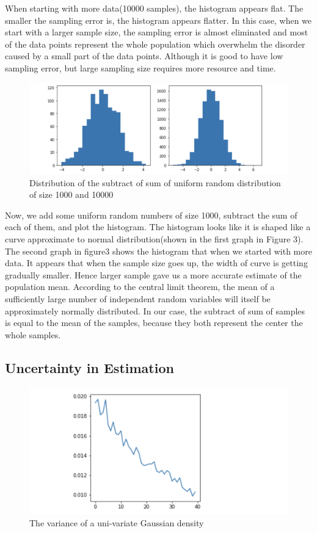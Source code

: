 \documentclass[10pt]{article}
\begin{document}
When starting with more data(10000 samples), the histogram appears flat. The smaller the sampling error is, the histogram appears flatter. In this case, when we start with a larger sample size, the sampling error is almost eliminated and most of the data points represent the whole population which overwhelm the disorder caused by a small part of the data points. Although it is good to have low sampling error, but large sampling size requires more resource and time.

\begin{figure}
\centering 
\vspace{-7mm}
\hspace{20mm}
\includegraphics[width=0.7\linewidth]{sumofuniform2.png} 
\caption{\footnotesize  Distribution of the subtract of sum of uniform random distribution of size 1000 and 10000}
\centering
\end{figure}

Now, we add some uniform random numbers of size 1000, subtract the sum of each of them, and plot the histogram. The histogram looks like it is shaped like a curve approximate to normal distribution(shown in the first graph in Figure 3). The second graph in figure3 shows the histogram that when we started with more data. It appears that when the sample size goes up, the width of curve is getting gradually smaller. Hence larger sample gave us a more accurate estimate of the population mean. According to the central limit theorem, the mean of a sufficiently large number of independent random variables will itself be approximately normally distributed. In our case, the subtract of sum of samples is equal to the mean of the samples, because they both represent the center the whole samples. 

\subsection{Uncertainty in Estimation}

\begin{figure}
\centering 
\vspace{-5mm}
\hspace{20mm}
\includegraphics[width=0.5\linewidth]{UncertaintyInEstimation.png} 
\caption{\footnotesize  The variance of a uni-variate Gaussian density}
\centering
\end{figure}
\end{document}

